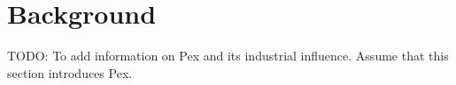 \section{Background}
\label{sec:background}

TODO: To add information on Pex and its industrial influence. Assume that this section introduces Pex.